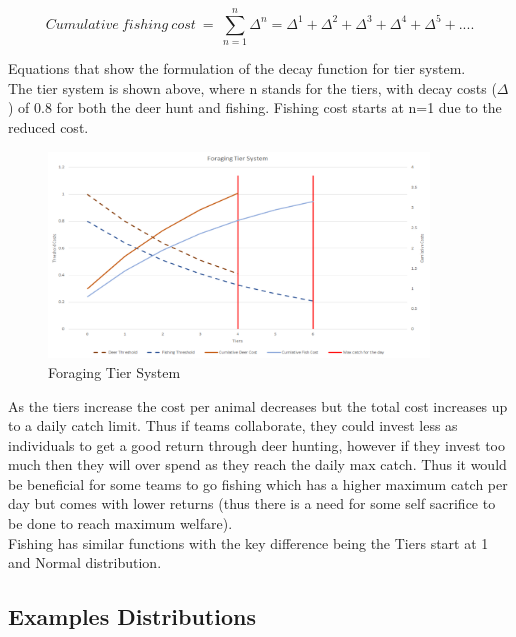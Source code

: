 \begin{equation}
Cumulative\ fishing\ cost \ = \ \sum_{n=1}^{n} \Delta^{n} = \Delta^{1} + \Delta^{2} + \Delta^{3} + \Delta^{4} + \Delta^{5} + ....
\end{equation}

Equations that show the formulation of the decay function for tier system.\\

The tier system is shown above, where n stands for the tiers, with decay costs ($\Delta$) of 0.8 for both the deer hunt and fishing. Fishing cost starts at n=1 due to the reduced cost.\\

\begin{figure}[!htb]
    \centering
    \includegraphics[width=0.9\textwidth]{04_environment/Images/Foraging Tier System.PNG}
    \caption{Foraging Tier System}
    \label{Images:Foraging Tier System}
\end{figure}

As the tiers increase the cost per animal decreases but the total cost increases up to a daily catch limit. Thus if teams collaborate, they could invest less as individuals to get a good return through deer hunting, however if they invest too much then they will over spend as they reach the daily max catch. Thus it would be beneficial for some teams to go fishing which has a higher maximum catch per day but comes with lower returns (thus there is a need for some self sacrifice to be done to reach maximum welfare). \\ 

Fishing has similar functions with the key difference being the Tiers start at 1 and Normal distribution. \\

\newpage
\subsection{Examples Distributions}
